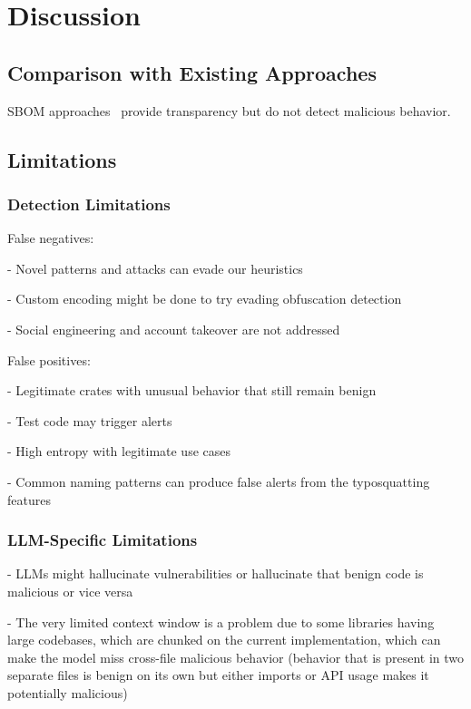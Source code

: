 \chapter{Discussion}\label{chapter:chap8}

\section{Comparison with Existing Approaches}\label{sect:comparison}

SBOM approaches~\cite{spdx2024,owasp2024} provide transparency but do not detect malicious behavior.

\section{Limitations}\label{sect:limitations}

\subsection{Detection Limitations}\label{subsect:detection-limitations}

False negatives:

- Novel patterns and attacks can evade our heuristics

- Custom encoding might be done to try evading obfuscation detection

- Social engineering and account takeover are not addressed

False positives:

- Legitimate crates with unusual behavior that still remain benign

- Test code may trigger alerts

- High entropy with legitimate use cases

- Common naming patterns can produce false alerts from the typosquatting features

\subsection{LLM-Specific Limitations}\label{subsect:llm-limitations}

- LLMs might hallucinate vulnerabilities or hallucinate that benign code is malicious or vice versa

- The very limited context window is a problem due to some libraries having large codebases, which are chunked on the current implementation, which can make the model miss cross-file malicious behavior (behavior that is present in two separate files is benign on its own but either imports or API usage makes it potentially malicious)

